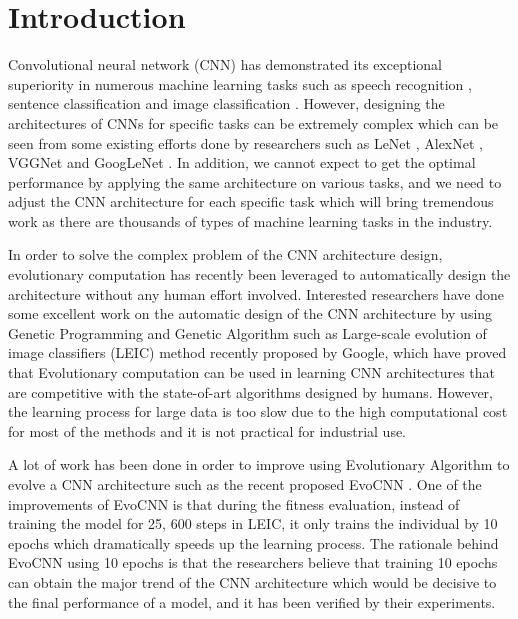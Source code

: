 \documentclass[conference]{IEEEtran}
\begin{document}
\section{Introduction}
Convolutional neural network (CNN) has demonstrated its exceptional superiority in numerous machine learning tasks such as speech recognition \cite{CNNspeech:Ossama}, sentence classification \cite{CNNsentence:Yoon} and image classification \cite{ImageNet:Alex}. However, designing the architectures of CNNs for specific tasks can be extremely complex which can be seen from some existing efforts done by researchers such as LeNet \cite{ZipcodeRecognition:LeCun}\cite{DocumentRecognition:LeCun}, AlexNet \cite{ImageNet:Alex}, VGGNet \cite{CNNverydeep:Simonyan} and GoogLeNet \cite{CNNdeeper:Szegedy}. %
In addition, we cannot expect to get the optimal performance by applying the same architecture on various tasks, and we need to adjust the CNN architecture for each specific task which will bring tremendous work as there are thousands of types of machine learning tasks in the industry. 


In order to solve the complex problem of the CNN architecture design, evolutionary computation has recently been leveraged to automatically design the architecture without any human effort involved. Interested researchers have done some excellent work on the automatic design of the CNN architecture by using Genetic Programming \cite{CNNGP:Suganuma} and Genetic Algorithm \cite{CNNevolve:Stanley} such as Large-scale evolution of image classifiers (LEIC) method \cite{LEIC:Real} recently proposed by Google, which have proved that Evolutionary computation can be used in learning CNN architectures that are competitive with the state-of-art algorithms designed by humans. However, the learning process for large data is too slow due to the high computational cost for most of the methods and it is not practical for industrial use. 

A lot of work has been done in order to improve using Evolutionary Algorithm to evolve a CNN architecture such as the recent proposed EvoCNN \cite{EvolveCNN:Yanan}. One of the improvements of EvoCNN is that during the fitness evaluation, instead of training the model for 25, 600 steps in LEIC, it only trains the individual by 10 epochs which dramatically speeds up the learning process. The rationale behind EvoCNN using 10 epochs is that the researchers believe that training 10 epochs can obtain the major trend of the CNN architecture which would be decisive to the final performance of a model, and it has been verified by their experiments. 
\end{document}
